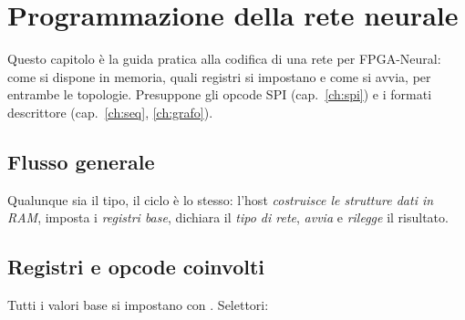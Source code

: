 \chapter[Programmazione della rete]{Programmazione della rete neurale}
\label{ch:prog}

Questo capitolo è la guida pratica alla codifica di una rete per FPGA-Neural: come si
dispone in memoria, quali registri si impostano e come si avvia, per entrambe le
topologie. Presuppone gli opcode SPI (cap.~\ref{ch:spi}) e i formati descrittore
(cap.~\ref{ch:seq}, \ref{ch:grafo}).

\section{Flusso generale}
Qualunque sia il tipo, il ciclo è lo stesso: l'host \emph{costruisce le strutture dati in
RAM}, imposta i \emph{registri base}, dichiara il \emph{tipo di rete}, \emph{avvia} e
\emph{rilegge} il risultato.

\begin{center}
\end{center}

\section{Registri e opcode coinvolti}
Tutti i valori base si impostano con  . Selettori:

